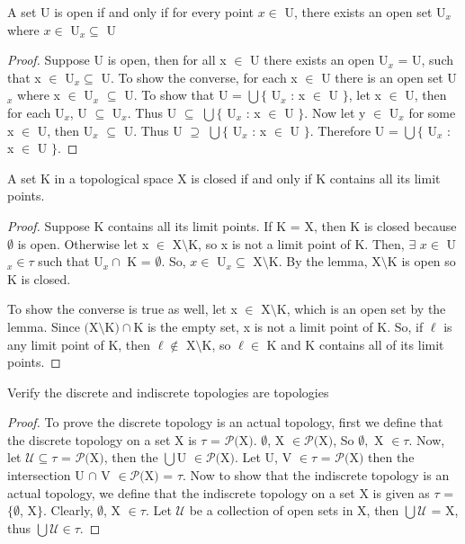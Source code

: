 \documentclass{article}
\begin{document}
	\begin{lemma}
	A set U is open if and only if for every point $x \in$ U, there exists an open set U$_x$ where $x \in $ U$_x \subseteq$ U
	\end{lemma}
	\begin{proof} Suppose U is open, then for all x $\in$ U there exists an open U$_x$ = U, such that x $\in$ U$_x \subseteq$ U.
	\newline
	To show the converse, for each x $\in$ U there is an open set U$_x$ where x $\in$ U$_x$ $\subseteq$ U. To show that U = $\bigcup \lbrace$ U$_x$ : x $\in$ U $\rbrace$, let x $\in$ U, then for each U$_x$, U $\subseteq$ U$_x$. Thus U $\subseteq$ $\bigcup \lbrace$ U$_x$ : x $\in$ U $\rbrace$. Now let y $\in$ U$_x$ for some x $\in$ U, then U$_x$ $\subseteq$ U. Thus U $\supseteq$ $\bigcup \lbrace$ U$_x$ : x $\in$ U $\rbrace$. Therefore U = $\bigcup \lbrace$ U$_x$ : x $\in$ U $\rbrace$.
	\end{proof}

	\begin{proposition}
		A set K in a topological space X is closed if and only if K contains all its limit points.
	\end{proposition}
	\begin{proof} Suppose K contains all its limit points.
	If K = X, then K is closed because $\emptyset$ is open.	Otherwise let x $\in$ X$\setminus$K, so x is not a limit point of K.	Then, $\exists$ $x \in$ U$_x \in \tau$ such that U$_x \cap$ K = $\emptyset$.	So, $x \in $ U$_x \subseteq$ X$\setminus$K.	By the lemma, X$\setminus$K is open so K is closed.

	To show the converse is true as well, let x $\in$ X$\setminus$K, which is an open set by the lemma. Since $($X$\setminus$K$)\cap$K is the empty set, x is not a limit point of K. So, if $\ell$ is any limit point of K, then $\ell \not\in$ X$\setminus$K, so $\ell \in$ K and K contains all of its limit points.
	\end{proof}

	\begin{proposition}
	Verify the discrete and indiscrete topologies are topologies
	\end{proposition}
	\begin{proof} To prove the discrete topology is an actual topology, first we define that the discrete topology on a set X is $\tau$ = $\mathcal{P}($X$)$.	$\emptyset$, X $\in \mathcal{P}($X$)$, So $\emptyset,$ X $\in \tau$. Now, let $\mathcal{U} \subseteq \tau$ = $\mathcal{P}($X$)$, then the $\bigcup$U $\in \mathcal{P}($X$)$. Let U, V $\in \tau$ = $\mathcal{P}($X$)$ then the intersection U $\cap$ V $\in \mathcal{P}($X$)$ = $\tau$. Now to show that the indiscrete topology is an actual topology, we define that the indiscrete topology on a set X is given as $\tau$ = $\lbrace \emptyset$, X$\rbrace$. Clearly, $\emptyset$, X $\in \tau$. Let $\mathcal{U}$ be a collection of open sets in X, then $\bigcup \mathcal{U}$ = X, thus $\bigcup \mathcal{U} \in \tau$.
	\end{proof}
\end{document}
